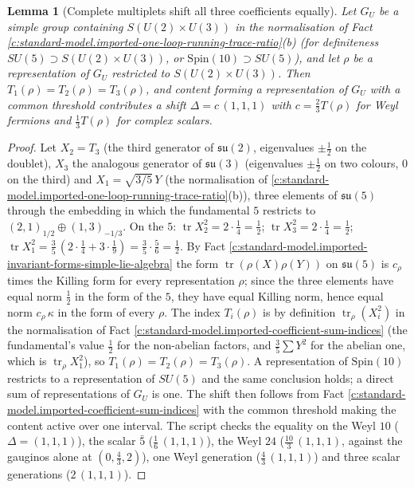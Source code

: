 \documentclass[11pt]{article}
\newtheorem{lemma}[theorem]{Lemma}
\theoremstyle{definition}
\theoremstyle{plain}
\providecommand{\Dl}{}\renewcommand{\Dl}{\Delta}
\providecommand{\su}{}\renewcommand{\su}{\mathfrak{su}}
\providecommand{\tr}{}\renewcommand{\tr}{\operatorname{tr}}
\begin{document}
\begin{lemma}[Complete multiplets shift all three coefficients equally]\label{c:standard-model.complete-multiplets-shift-all-three-coefficients}
Let $G_{U}$ be a simple group containing $S(U(2) \times U(3))$ in the normalisation of Fact \ref{c:standard-model.imported-one-loop-running-trace-ratio}(b) (for definiteness $SU(5) \supset S(U(2) \times U(3))$, or $\mathrm{Spin}(10) \supset SU(5)$), and let $\rho$ be a representation of $G_{U}$ restricted to $S(U(2) \times U(3))$. Then $T_{1}(\rho) = T_{2}(\rho) = T_{3}(\rho)$, and content forming a representation of $G_{U}$ with a common threshold contributes a shift $\Dl = c\,(1, 1, 1)$ with $c = \tfrac23 T(\rho)$ for Weyl fermions and $\tfrac13 T(\rho)$ for complex scalars.
\end{lemma}
\begin{proof}
Let $X_{2} = T_{3}$ (the third generator of $\su(2)$, eigenvalues $\pm\tfrac12$ on the doublet), $X_{3}$ the analogous generator of $\su(3)$ (eigenvalues $\pm\tfrac12$ on two colours, $0$ on the third) and $X_{1} = \sqrt{3/5}\,Y$ (the normalisation of \ref{c:standard-model.imported-one-loop-running-trace-ratio}(b)), three elements of $\su(5)$ through the embedding in which the fundamental $5$ restricts to $(2,1)_{1/2} \oplus (1,3)_{-1/3}$. On the $5$: $\tr X_{2}^{2} = 2 \cdot \tfrac14 = \tfrac12$; $\tr X_{3}^{2} = 2 \cdot \tfrac14 = \tfrac12$; $\tr X_{1}^{2} = \tfrac35\,(2 \cdot \tfrac14 + 3 \cdot \tfrac19) = \tfrac35 \cdot \tfrac56 = \tfrac12$. By Fact \ref{c:standard-model.imported-invariant-forms-simple-lie-algebra} the form $\tr(\rho(X)\rho(Y))$ on $\su(5)$ is $c_{\rho}$ times the Killing form for every representation $\rho$; since the three elements have equal norm $\tfrac12$ in the form of the $5$, they have equal Killing norm, hence equal norm $c_{\rho}\,\kappa$ in the form of every $\rho$. The index $T_{i}(\rho)$ is by definition $\tr_{\rho}(X_{i}^{2})$ in the normalisation of Fact \ref{c:standard-model.imported-coefficient-sum-indices} (the fundamental's value $\tfrac12$ for the non-abelian factors, and $\tfrac35 \sum Y^{2}$ for the abelian one, which is $\tr_{\rho}X_{1}^{2}$), so $T_{1}(\rho) = T_{2}(\rho) = T_{3}(\rho)$. A representation of $\mathrm{Spin}(10)$ restricts to a representation of $SU(5)$ and the same conclusion holds; a direct sum of representations of $G_{U}$ is one. The shift then follows from Fact \ref{c:standard-model.imported-coefficient-sum-indices} with the common threshold making the content active over one interval. The script checks the equality on the Weyl $10$ ($\Dl = (1,1,1)$), the scalar $\bar{5}$ ($\tfrac16\,(1,1,1)$), the Weyl $24$ ($\tfrac{10}{3}\,(1,1,1)$, against the gauginos alone at $(0, \tfrac43, 2)$), one Weyl generation ($\tfrac43\,(1,1,1)$) and three scalar generations ($2\,(1,1,1)$).

\end{proof}
\end{document}

